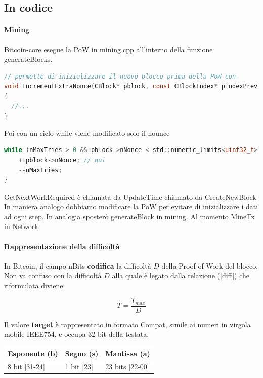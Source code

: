 \documentclass{book}
\theoremstyle{definition}
\begin{document}
\subsection{In codice}

\paragraph{Mining}
Bitcoin-core esegue la PoW in mining.cpp all'interno della funzione generateBlocks.

\lstset{style=mystyle}
\begin{lstlisting}[language=c]
// permette di inizializzare il nuovo blocco prima della PoW con
void IncrementExtraNonce(CBlock* pblock, const CBlockIndex* pindexPrev, unsigned int& nExtraNonce)
{
  //...
}
\end{lstlisting}

Poi con un ciclo while viene modificato solo il nounce

\lstset{style=mystyle}
\begin{lstlisting}[language=c]
while (nMaxTries > 0 && pblock->nNonce < std::numeric_limits<uint32_t>::max() && !CheckProofOfWork(pblock->GetHash(), pblock->nBits, Params().GetConsensus()) && !ShutdownRequested()) {
    ++pblock->nNonce; // qui
    --nMaxTries;
}
\end{lstlisting}

GetNextWorkRequired è chiamata da UpdateTime chiamato da CreateNewBlock
In maniera analogo dobbiamo modificare la PoW per evitare di inizializzare i dati ad ogni step.
In analogia sposterò generateBlock in mining. Al momento MineTx in Network

\paragraph{Rappresentazione della difficoltà}


In Bitcoin, il campo nBits \textbf{codifica} la difficoltà $D$ della Proof of Work del blocco.
Non va confuso con la difficoltà $D$ alla quale è legato dalla relazione (\ref{diff}) che riformulata diviene:

\begin{equation}
    T = \frac{T_{max}}{D} \label{targetFromDiff}
\end{equation}

Il valore \textbf{target} è rappresentato in formato Compat, simile ai numeri in virgola mobile IEEE754, e occupa 32 bit della testata.

\begin{table}[ht]
    \centering
    \begin{tabular}{|l|l|l|}
        \hline
        \multicolumn{1}{|c|}{Esponente (b)} & \multicolumn{1}{c|}{Segno (s)} & \multicolumn{1}{c|}{Mantissa (a)} \\ \hline
        8 bit {[}31-24{]}               & 1 bit {[}23{]}             & 23 bits {[}22-00{]}           \\ \hline
    \end{tabular}
\end{table}
\end{document}
